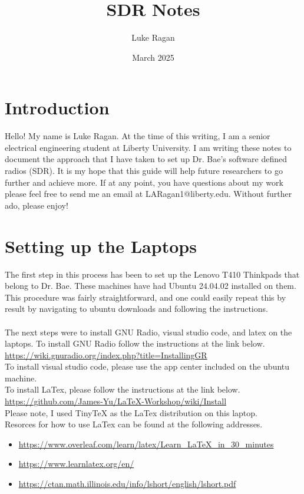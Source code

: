 \documentclass{article}
\title{SDR Notes}
\author{Luke Ragan}
\date{March 2025}
\begin{document}
\maketitle

\section{Introduction}
Hello! My name is Luke Ragan. At the time of this writing, I am a senior 
electrical engineering student at Liberty University. I am writing these notes 
to document the approach that I have taken to set up Dr. Bae's software
defined radios (SDR). It is my hope that this guide will help future 
researchers to go further and achieve more. If at any point, you have 
questions about my work please feel free to send me an email at LARagan1@liberty.edu.
Without further ado, please enjoy!

\section{Setting up the Laptops}
The first step in this process has been to set up the Lenovo T410 Thinkpads that
belong to Dr. Bae. These machines have had Ubuntu 24.04.02 installed on them. 
This procedure was fairly straightforward, and one could easily repeat this by
result by navigating to ubuntu downloads and following the instructions. \\ \\
The next steps were to install GNU Radio, visual studio code, and latex on the laptops.
To install GNU Radio follow the instructions at the link below. \\
\indent \url{https://wiki.gnuradio.org/index.php?title=InstallingGR} \\
To install visual studio code, please use the app center included on the ubuntu machine. \\
To install LaTex, please follow the instructions at the link below. \\
\indent \url{https://github.com/James-Yu/LaTeX-Workshop/wiki/Install} \\
Please note, I used TinyTeX as the LaTex distribution on this laptop. \\
Resorces for how to use LaTex can be found at the following addresses.
\begin{itemize}
    \item \url{https://www.overleaf.com/learn/latex/Learn_LaTeX_in_30_minutes}
    \item \url{https://www.learnlatex.org/en/}
    \item \url{https://ctan.math.illinois.edu/info/lshort/english/lshort.pdf}
\end{itemize}
\end{document}
